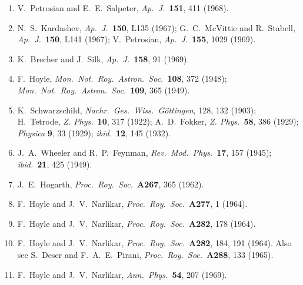 \begin{enumerate}
  \item{}\label{ch16-ref-11}
  V.~Petrosian and E.~E.~Salpeter,
  \emph{Ap.\ J.}\ \textbf{151}, 411 (1968).

  \item{}\label{ch16-ref-12}
  N.~S.~Kardashev, \emph{Ap.\ J.}\ \textbf{150}, L135 (1967);
  G.~C.~McVittie and R.~Stabell,
  \emph{Ap.\ J.}\ \textbf{150}, L141 (1967);
  V.~Petrosian, \emph{Ap.\ J.}\ \textbf{155}, 1029 (1969).

  \item{}\label{ch16-ref-13}
  K.~Brecher and J.~Silk, \emph{Ap.\ J.}\ \textbf{158}, 91 (1969).

  \item{}\label{ch16-ref-14}
  F.~Hoyle, \emph{Mon.\ Not.\ Roy.\ Astron.\ Soc.}\ \textbf{108}, 372
  (1948); \emph{Mon.\ Not.\ Roy.\ Astron.\ Soc.}\ \textbf{109}, 365
  (1949).

  \item{}\label{ch16-ref-15}
  K.~Schwarzschild, \emph{Nachr.\ Ges.\ Wiss.\ G\"ottingen}, 128, 132
  (1903); H.~Tetrode, \emph{Z. Phys.}\ \textbf{10}, 317 (1922);
  A.~D.~Fokker, \emph{Z. Phys.}\ \textbf{58}, 386 (1929);
  \emph{Physica} \textbf{9}, 33 (1929); \emph{ibid.}\ \textbf{12}, 145
  (1932).

  \item{}\label{ch16-ref-16}
  J.~A.~Wheeler and R.~P.~Feynman,
  \emph{Rev.\ Mod.\ Phys.}\ \textbf{17}, 157 (1945);
  \emph{ibid.}\ \textbf{21}, 425 (1949).

  \item{}\label{ch16-ref-17}
  J.~E.~Hogarth, \emph{Proc.\ Roy.\ Soc.}\ \textbf{A267}, 365 (1962).

  \item{}\label{ch16-ref-18}
  F.~Hoyle and J.~V.~Narlikar,
  \emph{Proc.\ Roy.\ Soc.}\ \textbf{A277}, 1 (1964).

  \item{}\label{ch16-ref-19}
  F.~Hoyle and J.~V.~Narlikar,
  \emph{Proc.\ Roy.\ Soc.}\ \textbf{A282}, 178 (1964).

  \item{}\label{ch16-ref-20}
  F.~Hoyle and J.~V.~Narlikar,
  \emph{Proc.\ Roy.\ Soc.}\ \textbf{A282}, 184, 191 (1964).
  Also see S.~Deser and F.~A.~E.~Pirani,
  \emph{Proc.\ Roy.\ Soc.}\ \textbf{A288}, 133 (1965).

  \item{}\label{ch16-ref-21}
  F.~Hoyle and J.~V.~Narlikar,
  \emph{Ann.\ Phys.}\ \textbf{54}, 207 (1969).


\end{enumerate}
